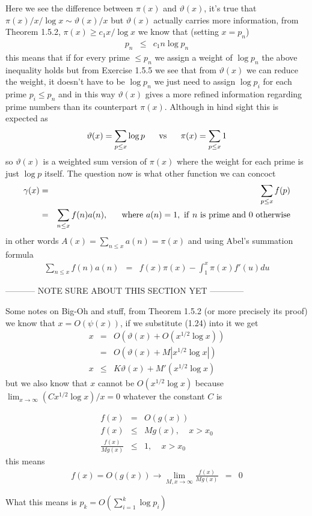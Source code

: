 \documentclass[aps,preprint,preprintnumbers,nofootinbib,showpacs,prd]{revtex4-1}
\newcommand{\nbea}{\begin{eqnarray*}}
\newcommand{\neea}{\end{eqnarray*}}
\begin{document}
Here we see the difference between $\pi(x)$ and $\vartheta(x)$, it's true that $\pi(x)/x/\log x \sim \vartheta(x)/x$ but $\vartheta(x)$ actually carries more information, from Theorem 1.5.2, $\pi(x) \ge c_1 x/\log x$ we know that (setting $x = p_n$)
%
\nbea
p_n & \le & c_1 n \log p_n
\neea
%
this means that if for every prime $\le p_n$ we assign a weight of $\log p_n$ the above inequality holds but from Exercise 1.5.5 we see that from $\vartheta(x)$ we can reduce the weight, it doesn't have to be $\log p_n$ we just need to assign $\log p_i$ for each prime $p_i \le p_n$ and in this way $\vartheta(x)$ gives a more refined information regarding prime numbers than its counterpart $\pi(x)$. Although in hind sight this is expected as
%
\nbea
\vartheta(x) = \sum_{p\le x} \log p ~~~~~ {\rm vs} ~~~~~ \pi(x) = \sum_{p \le x} 1
\neea
%
so $\vartheta(x)$ is a weighted sum version of $\pi(x)$ where the weight for each prime is just $\log p$ itself. The question now is what other function we can concoct 
%
\nbea
\gamma(x) & = & \sum_{p \le x} f(p) \\
& = & \sum_{n \le x} f(n) a(n), ~~~~~ {\rm where~} a(n) = 1, ~{\rm if~} n ~{\rm is~prime~and~} 0 ~{\rm otherwise}
\neea
%
in other words $A(x) = \sum_{n\le x} a(n) = \pi(x)$ and using Abel's summation formula
%
\nbea
\sum_{n \le x} f(n) a(n) & = & f(x) \pi(x) - \int_1^x \pi(x) f'(u) du
\neea
%



----------- NOTE SURE ABOUT THIS SECTION YET ------------



Some notes on Big-Oh and stuff, from Theorem 1.5.2 (or more precisely its proof) we know that $x = O(\psi(x))$, if we substitute (1.24) into it we get
%
\nbea
x & = & O(\vartheta(x) + O(x^{1/2} \log x)) \\
& = & O(\vartheta(x) + M|x^{1/2} \log x|) \\
x & \le & K \vartheta(x) + M'(x^{1/2} \log x)
\neea
%
but we also know that $x$ cannot be $O(x^{1/2}\log x)$ because $\lim_{x\to\infty}(C x^{1/2}\log x)/x = 0$ whatever the constant $C$ is


%
\nbea
f(x) & = & O(g(x)) \\
f(x) & \le & M g(x), ~~~~~ x > x_0 \\
\frac{f(x)}{Mg(x)} & \le & 1, ~~~~~ x > x_0
\neea
%
this means
%
\nbea
f(x) = O(g(x)) \to \lim_{M,x\to\infty} \frac{f(x)}{Mg(x)} & = & 0
\neea
%

What this means is $p_k = O\left(\sum_{i=1}^k \log p_i \right)$
\end{document}
